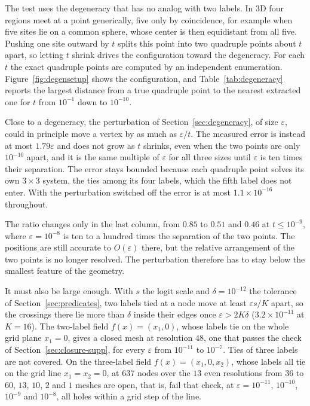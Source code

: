 \documentclass[11pt]{article}
\theoremstyle{definition}
\begin{document}
The test uses the degeneracy that has no analog with two labels. In 3D four
regions meet at a point generically, five only by coincidence, for example
when five sites lie on a common sphere, whose center is then equidistant from
all five. Pushing one site outward by $t$ splits this point into two
quadruple points about $t$ apart, so letting $t$ shrink drives the
configuration toward the degeneracy. For each $t$ the exact
quadruple points are computed by an independent enumeration.
Figure~\ref{fig:degensetup} shows the configuration, and
Table~\ref{tab:degeneracy} reports the largest distance from a true quadruple
point to the nearest extracted one for $t$ from $10^{-1}$ down to $10^{-10}$.

Close to a degeneracy, the perturbation of Section~\ref{sec:degeneracy}, of
size $\varepsilon$, could in principle move a vertex by as much as
$\varepsilon/t$. The measured error is instead at most $1.79\varepsilon$ and
does not grow as $t$ shrinks, even when the two points are only $10^{-10}$
apart, and it is the same multiple of $\varepsilon$ for all three sizes until
$\varepsilon$ is ten times their separation. The error stays bounded because
each quadruple point solves its own $3\times3$ system, the ties among its
four labels, which the fifth label does not enter. With the perturbation switched off the
error is at most $1.1\times10^{-16}$ throughout.

The ratio changes only in the last column, from $0.85$ to $0.51$ and $0.46$
at $t \le 10^{-9}$, where $\varepsilon = 10^{-8}$ is ten to a hundred times the
separation of the two points. The positions are still accurate to
$O(\varepsilon)$ there, but the relative arrangement of the two points is no
longer resolved. The perturbation therefore has to stay below the smallest
feature of the geometry.

It must also be large enough. With $s$ the logit scale and $\delta = 10^{-12}$
the tolerance of Section~\ref{sec:predicates}, two labels tied at a node move at least
$\varepsilon s/K$ apart, so the crossings there lie more than $\delta$ inside
their edges once $\varepsilon > 2K\delta$ ($3.2\times10^{-11}$ at $K = 16$).
The two-label field $f(x) = (x_1, 0)$, whose labels tie on the whole grid
plane $x_1 = 0$, gives a closed mesh at resolution $48$, one that passes the
check of Section~\ref{sec:closure-supp}, for
every $\varepsilon$ from $10^{-11}$ to $10^{-7}$. Ties of three labels are not
covered. On the three-label field $f(x) = (x_1, 0, x_2)$, whose labels all tie
on the grid line $x_1 = x_2 = 0$, at $637$
nodes over the $13$ even resolutions from $36$ to $60$, $13$, $10$, $2$ and $1$ meshes
are open, that is, fail that check, at $\varepsilon = 10^{-11}$, $10^{-10}$, $10^{-9}$ and $10^{-8}$, all
holes within a grid step of the line.
\end{document}
